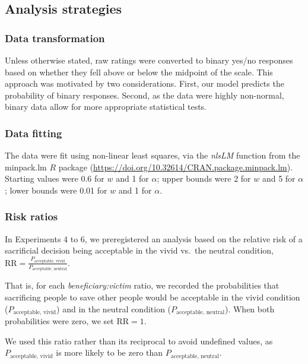 \documentclass[
]{article}
\begin{document}
\subsection{Analysis strategies}\label{analysis-strategies}

\subsubsection{Data transformation}\label{data-transformation}

Unless otherwise stated, raw ratings were converted to binary yes/no responses based on whether they fell above or below the midpoint of the scale. This approach was motivated by two considerations. First, our model predicts the probability of binary responses. Second, as the data were highly non-normal, binary data allow for more appropriate statistical tests.

\subsubsection{Data fitting}\label{data-fitting}

The data were fit using non-linear least squares, via the \emph{nlsLM} function from the minpack.lm \(R\) package (\url{https://doi.org/10.32614/CRAN.package.minpack.lm}). Starting values were 0.6 for \(w\) and 1 for \(\alpha\); upper bounds were 2 for \(w\) and 5 for \(\alpha\); lower bounds were 0.01 for \(w\) and 1 for \(\alpha\).

\subsubsection{Risk ratios}\label{risk-ratios}

In Experiments 4 to 6, we preregistered an analysis based on the relative risk of a sacrificial decision being acceptable in the vivid vs.~the neutral condition, \(\mathrm{RR}= \frac{P_{\text{acceptable, vivid}}}{P_{\text{acceptable, neutral}}}\).

That is, for each \emph{beneficiary:victim} ratio, we recorded the probabilities that sacrificing people to save other people would be acceptable in the vivid condition (\(P_{\text{acceptable, vivid}}\)) and in the neutral condition (\(P_{\text{acceptable, neutral}}\)). When both probabilities were zero, we set \(\mathrm{RR}= 1\).

We used this ratio rather than its reciprocal to avoid undefined values, as \(P_{\text{acceptable, vivid}}\) is more likely to be zero than \(P_{\text{acceptable, neutral}}\).
\end{document}
